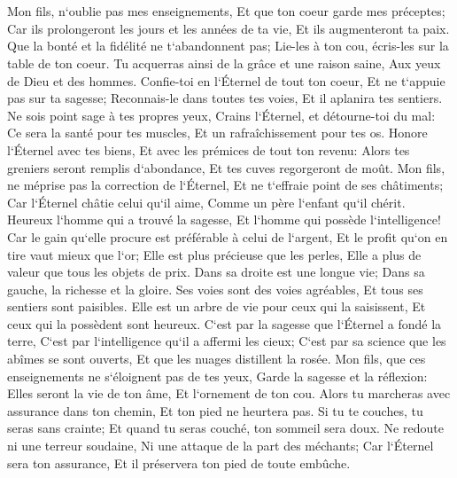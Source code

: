 \chapter{}

\verse Mon fils, n`oublie pas mes enseignements, Et que ton coeur garde mes préceptes; 
\verse Car ils prolongeront les jours et les années de ta vie, Et ils augmenteront ta paix. 
\verse Que la bonté et la fidélité ne t`abandonnent pas; Lie-les à ton cou, écris-les sur la table de ton coeur. 
\verse Tu acquerras ainsi de la grâce et une raison saine, Aux yeux de Dieu et des hommes. 
\verse Confie-toi en l`Éternel de tout ton coeur, Et ne t`appuie pas sur ta sagesse; 
\verse Reconnais-le dans toutes tes voies, Et il aplanira tes sentiers. 
\verse Ne sois point sage à tes propres yeux, Crains l`Éternel, et détourne-toi du mal: 
\verse Ce sera la santé pour tes muscles, Et un rafraîchissement pour tes os. 
\verse Honore l`Éternel avec tes biens, Et avec les prémices de tout ton revenu: 
\verse Alors tes greniers seront remplis d`abondance, Et tes cuves regorgeront de moût. 
\verse Mon fils, ne méprise pas la correction de l`Éternel, Et ne t`effraie point de ses châtiments; 
\verse Car l`Éternel châtie celui qu`il aime, Comme un père l`enfant qu`il chérit. 
\verse Heureux l`homme qui a trouvé la sagesse, Et l`homme qui possède l`intelligence! 
\verse Car le gain qu`elle procure est préférable à celui de l`argent, Et le profit qu`on en tire vaut mieux que l`or; 
\verse Elle est plus précieuse que les perles, Elle a plus de valeur que tous les objets de prix. 
\verse Dans sa droite est une longue vie; Dans sa gauche, la richesse et la gloire. 
\verse Ses voies sont des voies agréables, Et tous ses sentiers sont paisibles. 
\verse Elle est un arbre de vie pour ceux qui la saisissent, Et ceux qui la possèdent sont heureux. 
\verse C`est par la sagesse que l`Éternel a fondé la terre, C`est par l`intelligence qu`il a affermi les cieux; 
\verse C`est par sa science que les abîmes se sont ouverts, Et que les nuages distillent la rosée. 
\verse Mon fils, que ces enseignements ne s`éloignent pas de tes yeux, Garde la sagesse et la réflexion: 
\verse Elles seront la vie de ton âme, Et l`ornement de ton cou. 
\verse Alors tu marcheras avec assurance dans ton chemin, Et ton pied ne heurtera pas. 
\verse Si tu te couches, tu seras sans crainte; Et quand tu seras couché, ton sommeil sera doux. 
\verse Ne redoute ni une terreur soudaine, Ni une attaque de la part des méchants; 
\verse Car l`Éternel sera ton assurance, Et il préservera ton pied de toute embûche. 

